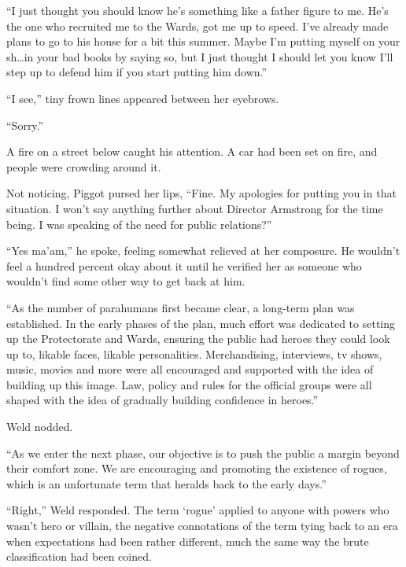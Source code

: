 ``I just thought you should know he's something like a father figure to me.  He's the one who recruited me to the Wards, got me up to speed.  I've already made plans to go to his house for a bit this summer.  Maybe I'm putting myself on your sh\ldots in your bad books by saying so, but I just thought I should let you know I'll step up to defend him if you start putting him down.''



``I see,'' tiny frown lines appeared between her eyebrows.



``Sorry.''



A fire on a street below caught his attention.  A car had been set on fire, and people were crowding around it.



Not noticing, Piggot pursed her lips, ``Fine.  My apologies for putting you in that situation.  I won't say anything further about Director Armstrong for the time being.  I was speaking of the need for public relations?''



``Yes ma'am,'' he spoke, feeling somewhat relieved at her composure.  He wouldn't feel a hundred percent okay about it until he verified her as someone who wouldn't find some other way to get back at him.



``As the number of parahumans first became clear, a long-term plan was established.  In the early phases of the plan, much effort was dedicated to setting up the Protectorate and Wards, ensuring the public had heroes they could look up to, likable faces, likable personalities.  Merchandising, interviews, tv shows, music, movies and more were all encouraged and supported with the idea of building up this image.  Law, policy and rules for the official groups were all shaped with the idea of gradually building confidence in heroes.''



Weld nodded.



``As we enter the next phase, our objective is to push the public a margin beyond their comfort zone.  We are encouraging and promoting the existence of rogues, which is an unfortunate term that heralds back to the early days.''



``Right,'' Weld responded.  The term `rogue' applied to anyone with powers who wasn't hero or villain, the negative connotations of the term tying back to an era when expectations had been rather different, much the same way the brute classification had been coined.



